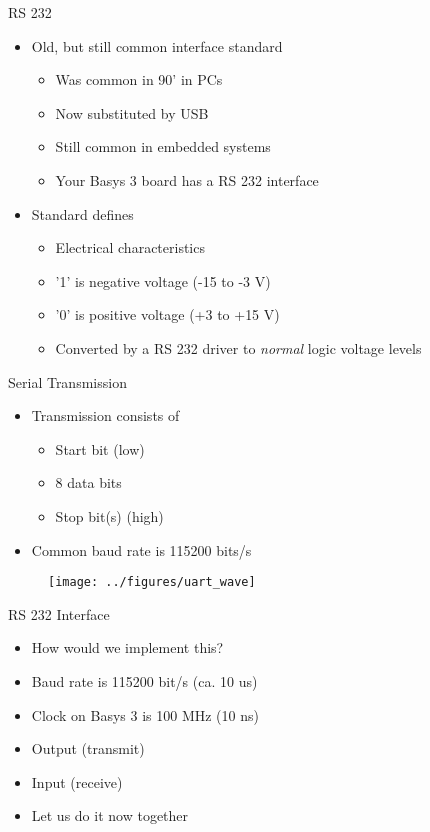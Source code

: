 \begin{frame}[fragile]{RS 232}
\begin{itemize}
\item Old, but still common interface standard
\begin{itemize}
\item Was common in 90' in PCs
\item Now substituted by USB
\item Still common in embedded systems
\item Your Basys 3 board has a RS 232 interface
\end{itemize}
\item Standard defines
\begin{itemize}
\item Electrical characteristics
\item '1' is negative voltage (-15 to -3 V)
\item '0' is positive voltage (+3 to +15 V)
\item Converted by a RS 232 driver to \emph{normal} logic voltage levels
\end{itemize}
\end{itemize}
\end{frame}


\begin{frame}[fragile]{Serial Transmission}
\begin{itemize}
\item Transmission consists of
\begin{itemize}
\item Start bit (low)
\item 8 data bits
\item Stop bit(s) (high)
\end{itemize}
\item Common baud rate is 115200 bits/s
\end{itemize}
\begin{figure}
  \texttt{[image: ../figures/uart\_wave]}
\end{figure}
\end{frame}

\begin{frame}[fragile]{RS 232 Interface}
\begin{itemize}
\item How would we implement this?
\item Baud  rate is 115200 bit/s (ca. 10 us)
\item Clock on Basys 3 is 100 MHz (10 ns)
\item Output (transmit)
\item Input (receive)
\item Let us do it now together
\end{itemize}
\end{frame}

